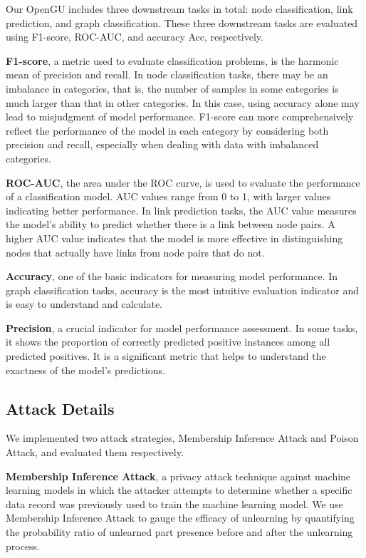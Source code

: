 Our OpenGU includes three downstream tasks in total: node classification, link prediction, and graph classification. These three downstream tasks are evaluated using F1-score, ROC-AUC, and accuracy Acc, respectively.

\textbf{F1-score}, a metric used to evaluate classification problems, is the harmonic mean of precision and recall. In node classification tasks, there may be an imbalance in categories, that is, the number of samples in some categories is much larger than that in other categories. In this case, using accuracy alone may lead to misjudgment of model performance. F1-score can more comprehensively reflect the performance of the model in each category by considering both precision and recall, especially when dealing with data with imbalanced categories.

\textbf{ROC-AUC}, the area under the ROC curve, is used to evaluate the performance of a classification model. AUC values range from 0 to 1, with larger values indicating better performance. In link prediction tasks, the AUC value measures the model's ability to predict whether there is a link between node pairs. A higher AUC value indicates that the model is more effective in distinguishing nodes that actually have links from node pairs that do not.

\textbf{Accuracy}, one of the basic indicators for measuring model performance. In graph classification tasks, accuracy is the most intuitive evaluation indicator and is easy to understand and calculate.

\textbf{Precision}, a crucial indicator for model performance assessment. In some tasks, it shows the proportion of correctly predicted positive instances among all predicted positives. It is a significant metric that helps to understand the exactness of the model's predictions.



\subsection{Attack Details}
\label{A.Attack}

We implemented two attack strategies, Membership Inference Attack and Poison Attack, and evaluated them respectively.

\textbf{Membership Inference Attack}, a privacy attack technique against machine learning models in which the attacker attempts to determine whether a specific data record was previously used to train the machine learning model. We use Membership Inference Attack to gauge the efficacy of unlearning by quantifying the probability ratio of unlearned part presence before and after the unlearning process.

